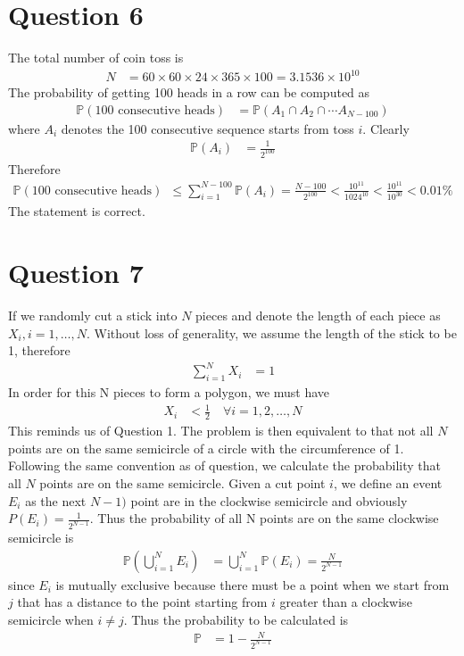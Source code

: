 \documentclass[12pt]{article}
\begin{document}
\section*{Question 6}
\begin{solution}
The total number of coin toss is 
\begin{align}
N &= 60\times60\times24\times365\times100 = 3.1536\times10^{10}
\end{align}
The probability of getting 100 heads in a row can be computed as
 \begin{align}
\mathbb{P}\left(\textrm{100 consecutive heads}\right)&= \mathbb{P}\left(A_1\cap A_2 \cap\cdots A_{N-100}\right)
\end{align}
where $A_i$ denotes the 100 consecutive sequence starts from toss $i$. Clearly
\begin{align}
\mathbb{P}(A_i) &= \frac{1}{2^{100}}
\end{align}
Therefore
\begin{align}
\mathbb{P}\left(\textrm{100 consecutive heads}\right)& \leq \sum_{i=1}^{N-100}\mathbb{P}(A_i) = \frac{N-100}{2^{100}} < \frac{10^{11}}{1024^{10}}< \frac{10^{11}}{10^{30}} < 0.01\%
\end{align}
The statement is correct.
\end{solution}


\section*{Question 7}
\begin{solution}
If we randomly cut a stick into $N$ pieces and denote the length of each piece as $X_i,i=1,\ldots,N$. Without loss of generality, we assume the length of the stick to be 1, therefore
\begin{align}
\sum_{i=1}^NX_i &=1
\end{align}
In order for  this N pieces to form a polygon, we must have
\begin{align}
X_i &< \frac{1}{2}\quad\forall i=1,2,\ldots,N
\end{align}
This reminds us of Question 1. The problem is then equivalent to that not all $N$ points are on the same semicircle of a circle with the circumference of 1. Following the same convention as of question, we calculate the probability that all $N$ points are on the same semicircle. Given a cut point $i$, we define an event $E_i$ as the next $N-1)$ point are in the clockwise semicircle and obviously $P(E_i) = \frac{1}{2^{N-1}}$. Thus the probability of all N points are on the same clockwise semicircle is 
\begin{align}
\mathbb{P}\left(\bigcup_{i=1}^NE_i\right) &=\bigcup_{i=1}^N\mathbb{P}\left(E_i\right) = \frac{N}{2^{N-1}}
\end{align}
since $E_i$ is mutually exclusive because there must be a point when we start from $j$ that has a distance to the point starting from $i$ greater than a clockwise semicircle when $i\neq j$.
Thus the probability to be calculated is 
\begin{align}
\mathbb{P} &= 1- \frac{N}{2^{N-1}}
\end{align} 
\end{solution}
\end{document}

